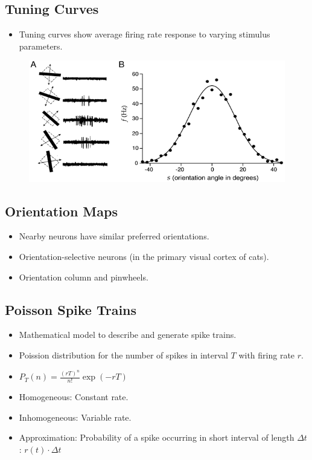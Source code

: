\documentclass[a4paper, 12pt]{article}
\begin{document}
\subsection{Tuning Curves}
\begin{itemize}[noitemsep,nolistsep]
	\item Tuning curves show average firing rate response to varying stimulus parameters.
\end{itemize}
\begin{figure}[H]
	\centering
	\includegraphics[scale=0.5]{tuning-curve.png}
\end{figure}

\subsection{Orientation Maps}
\begin{itemize}[noitemsep,nolistsep]
	\item Nearby neurons have similar preferred orientations.
	\item Orientation-selective neurons (in the primary visual cortex of cats).
	\item Orientation column and pinwheels.
\end{itemize}

\subsection{Poisson Spike Trains}
\begin{itemize}[noitemsep,nolistsep]
	\item Mathematical model to describe and generate spike trains.
	\item Poission distribution for the number of spikes in interval $T$ with firing rate $r$.
	\item $P_T(n)=\frac{(rT)^n}{n!}\exp(-rT)$
	\item Homogeneous: Constant rate.
	\item Inhomogeneous: Variable rate.
	\item Approximation: Probability of a spike occurring in short interval of length $\Delta t$: $r(t)\cdot\Delta t$
\end{itemize}
\end{document}
